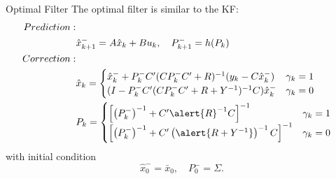 \documentclass[10pt]{beamer}
\DeclareMathOperator{\1}{\textbf{1}}
\begin{document}
\begin{frame}{Optimal Filter}
  The optimal filter is similar to the KF:
  \begin{align*}
    Prediction:&&\\
	       &\hat x _{k + 1}^-  = A \hat x_{k} + Bu_k  , \quad P_{k + 1}^-  = h(P_k)\\
    Correction:&&\\
	       &\hat x_{k} = \begin{cases}
		 \hat x_{k}^-  + P_k^- C'(CP_k^- C'+R)^{-1} (y_k  - C \hat x _{k}^- ) & \gamma_ k = 1\\ 
		 (I - P_k^-C'(CP_k^-C'+R+Y^{-1})^{-1}C)\hat x_{k}^-   & \gamma_ k = 0 
	       \end{cases}\\
	       &P_{k} =\begin{cases}
		 \left[\left(P_k^-\right)^{-1} + C'\alert{R}^{-1}C\right]^{-1} & \gamma_k = 1\\
		 \left[\left(P_k^-\right)^{-1} + C'\left( \alert{R+Y^{-1} }\right)^{-1}C\right]^{-1}  &\gamma_k = 0
	       \end{cases}
  \end{align*}
  with initial condition
  \begin{displaymath}
    \hat x_{0}^-  = \bar x_0 ,\quad P_{0}^-  = \Sigma.
  \end{displaymath}
\end{frame}
\end{document}
